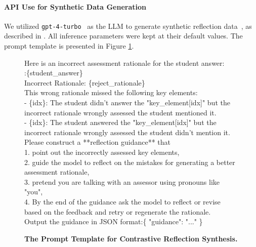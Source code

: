 \paragraph{API Use for Synthetic Data Generation} We utilized \texttt{gpt-4-turbo}~\cite{gpt4} as the LLM to generate synthetic reflection data~\cite{li2023overprompt}, as described in \textsection{\ref{sec:method_data_curation}}. All inference parameters were kept at their default values. The prompt template is presented in Figure \ref{box:prompt_template}.

\begin{figure}
\begin{tcolorbox}[
    colback=gray!10,      %
    colframe=gray!80,     %
    title=Template Prompt for Generate Reflection,
    fonttitle=\bfseries,  %
    rounded corners,
    boxrule=0.5mm,        %
    width=\linewidth
]
\scriptsize
Here is an incorrect assessment rationale for the student answer:\\
:\{student\_answer\}\\
Incorrect Rationale: \{reject\_rationale\}\\
This wrong rationale missed the following key elements:\\
- \{idx\}: The student didn't answer the "{key\_element[idx]}" but the incorrect rationale wrongly assessed the student mentioned it.\\
- \{idx\}: The student answered the "{key\_element[idx]}" but the incorrect rationale wrongly assessed the student didn't mention it.\\
Please construct a **reflection guidance** that\\
1. point out the incorrectly assessed key elements,\\
2. guide the model to reflect on the mistakes for generating a better assessment rationale,\\
3. pretend you are talking with an assessor using pronouns like "you",\\
4. By the end of the guidance ask the model to reflect or revise based on the feedback and retry or regenerate the rationale.\\
Output the guidance in JSON format:\{ "guidance": "..." \}
\end{tcolorbox}
\caption{\textbf{The Prompt Template for Contrastive Reflection Synthesis.}}
\label{box:prompt_template}
\end{figure}


